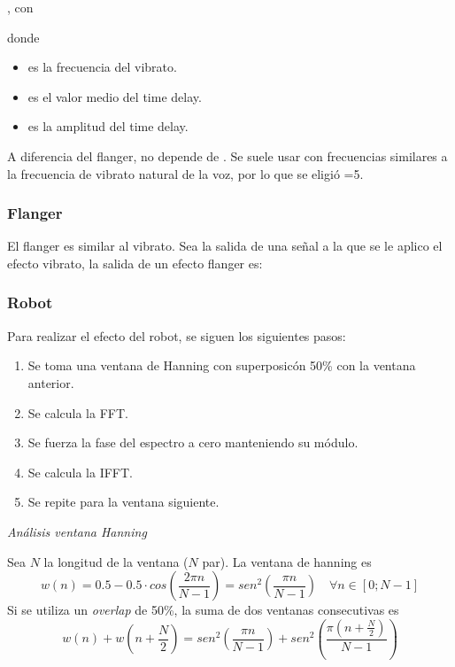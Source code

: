\documentclass[../ASSD_TP2.tex]{subfiles}
\begin{document}
\begin{center}
	, con 
\end{center}

donde 
\begin{itemize}
	\item {} es la frecuencia del vibrato.
	\item {} es el valor medio del time delay.
	\item {} es la amplitud del time delay.
	
\end{itemize}

A diferencia del flanger,  no depende de . Se suele usar con frecuencias similares a la frecuencia de vibrato natural de la voz, por lo que se eligi\'o =5.

\subsubsection*{Flanger}
El flanger es similar al vibrato. Sea  la salida de una se\~nal a la que se le aplico el efecto vibrato, la salida de un efecto flanger es:
\begin{center}
\end{center}

\subsubsection*{Robot}
Para realizar el efecto del robot, se siguen los siguientes pasos:
\begin{enumerate}
	\item Se toma una ventana de Hanning con superposic\'on 50\% con la ventana anterior.
	\item Se calcula la FFT.
	\item Se fuerza la fase del espectro a cero manteniendo su m\'odulo.
	\item Se calcula la IFFT.
	\item Se repite para la ventana siguiente.
\end{enumerate}


\textit{An\'alisis ventana Hanning}\par
Sea $N$ la longitud de la ventana ($N$ par). La ventana de hanning es 
\begin{equation}
w(n) = 0.5 - 0.5\cdot cos\left(\frac{2\pi n}{N-1}\right) = sen^2\left( \frac{\pi n}{N-1}\right) \quad \forall n\in[0; N-1]
\end{equation}
Si se utiliza un \textit{overlap} de 50\%, la suma de dos ventanas consecutivas es
\begin{equation}
w(n) + w\left(n+\frac{N}{2}\right) = sen^2\left( \frac{\pi n}{N-1}\right)  + sen^2\left( \frac{\pi \left(n + \frac{N}{2}\right) }{N-1}\right) 
\end{equation}
\end{document}
